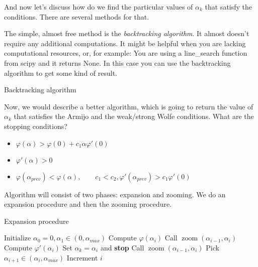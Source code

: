 And now let's discuss how do we find the particular values of $\alpha_k$ that satisfy the conditions. There are several methods for that.

The simple, almost free method is the \textit{backtracking algorithm}. It almost doesn't require any additional computations. It might be helpful when you are lacking computational resources, or, for example: You are using a line\_search function from scipy and it returns None. In this case you can use the backtracking algorithm to get some kind of result.

\begin{algorithm}
  \caption{Backtracking algorithm}
  \begin{algorithmic}[1]
      \State{$\alpha \gets \beta \alpha$}
  \EndWhile{}
\end{algorithmic}
\end{algorithm}

Now, we would describe a better algorithm, which is going to return the value of $\alpha_k$ that satisfies the Armijo and the weak/strong Wolfe conditions. What are the stopping conditions? 

\begin{itemize}
  \item $\varphi(\alpha) > \varphi(0) + c_1 \alpha \varphi'(0)$ 
  \item $\varphi'(\alpha) > 0$
  \item $\varphi(\alpha_{prev}) < \varphi(\alpha), \qquad c_1 < c_2, \varphi'(\alpha_{prev}) > c_1 \varphi'(0)$
\end{itemize}

Algorithm will consist of two phases: expansion and zooming. We do an expansion procedure and then the zooming procedure.

\begin{algorithm}[H]
  \caption{Expansion procedure}
  \begin{algorithmic}[1]
  \State Initialize $\alpha_0 = 0, \alpha_1 \in (0, \alpha_{max})$
      \State Compute $\varphi(\alpha_i)$
          \State Call $\operatorname{zoom}(\alpha_{i-1}, \alpha_i)$
      \EndIf
      \State Compute $\varphi'(\alpha_i)$
          \State Set $\alpha_k = \alpha_i$ and \textbf{stop}
      \EndIf
          \State Call $\operatorname{zoom}(\alpha_{i-1}, \alpha_i)$
      \EndIf
      \State Pick $\alpha_{i+1} \in (\alpha_i, \alpha_{max})$
      \State Increment $i$
  \EndWhile
\end{algorithmic}
\end{algorithm}

